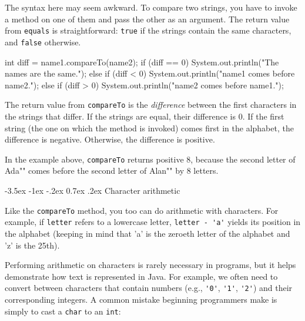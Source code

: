 \documentclass[12pt]{book}
\makeatletter
\theoremstyle{exercise}
\newcommand{\java}[1]{\verb"#1"}
\renewcommand{\section}{\@startsection {section}{1}{\z@}%
    {-3.5ex \@plus -1ex \@minus -.2ex}%
    {0.7ex \@plus.2ex}%
    {\normalfont\Large\bfseries}}
\newcommand{\java}[1]{\lstinline{#1}} %
\makeatother
\begin{document}
The syntax here may seem awkward.
To compare two strings, you have to invoke a method on one of them and pass the other as an argument.
The return value from \java{equals} is straightforward: \java{true} if the strings contain the same characters, and \java{false} otherwise.

\begin{code}
    int diff = name1.compareTo(name2);
    if (diff == 0) {
        System.out.println("The names are the same.");
    } else if (diff < 0) {
        System.out.println("name1 comes before name2.");
    } else if (diff > 0) {
        System.out.println("name2 comes before name1.");
    }
\end{code}

The return value from \java{compareTo} is the {\em difference} between the first characters in the strings that differ.
If the strings are equal, their difference is 0.
If the first string (the one on which the method is invoked) comes first in the alphabet, the difference is negative.
Otherwise, the difference is positive.

In the example above, \java{compareTo} returns positive 8, because the second letter of \java{"Ada"} comes before the second letter of \java{"Alan"} by 8 letters.


\section{Character arithmetic}




Like the \java{compareTo} method, you too can do arithmetic with characters.
For example, if \java{letter} refers to a lowercase letter, \java{letter - 'a'} yields its position in the alphabet (keeping in mind that 'a' is the zeroeth letter of the alphabet and 'z' is the 25th).

Performing arithmetic on characters is rarely necessary in programs, but it helps demonstrate how text is represented in Java.
For example, we often need to convert between characters that contain numbers (e.g., \java{'0'}, \java{'1'}, \java{'2'}) and their corresponding integers.
A common mistake beginning programmers make is simply to cast a \java{char} to an \java{int}:
\end{document}
